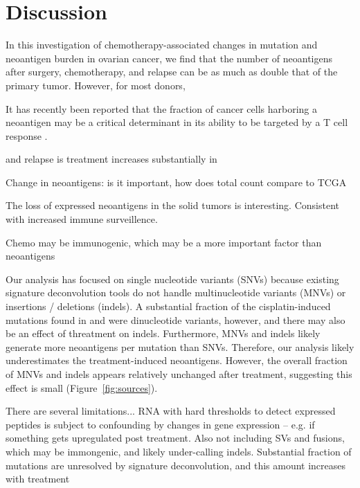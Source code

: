 \section*{Discussion}

In this investigation of chemotherapy-associated changes in mutation and neoantigen burden in ovarian cancer, we find that the number of neoantigens after surgery, chemotherapy, and relapse can be as much as double that of the primary tumor. However, for most donors, 


It has recently been reported that the fraction of cancer cells harboring a neoantigen may be a critical determinant in its ability to be targeted by a T cell response \cite{McGranahan_2016}. 

and relapse is  treatment increases substantially in  

Change in neoantigens: is it important, how does total count compare to TCGA


The loss of expressed neoantigens in the solid tumors is interesting. Consistent with increased immune surveillence.

Chemo may be immunogenic, which may be a more important factor than neoantigens

Our analysis has focused on single nucleotide variants (SNVs) because existing signature deconvolution tools do not handle multinucleotide variants (MNVs) or insertions / deletions (indels). A substantial fraction of the cisplatin-induced mutations found in \cite{Meier_2014} and \cite{Szikriszt_2016} were dinucleotide variants, however, and there may also be an effect of threatment on indels. Furthermore, MNVs and indels likely generate more neoantigens per mutation than SNVs. Therefore, our analysis likely underestimates the treatment-induced neoantigens. However, the overall fraction of MNVs and indels appears relatively unchanged after treatment, suggesting this effect is small (Figure~\ref{fig:sources}).

There are several limitations... RNA with hard thresholds to detect expressed peptides is subject to confounding by changes in gene expression -- e.g. if something gets upregulated post treatment. Also not including SVs and fusions, which may be immongenic, and likely under-calling indels. Substantial fraction of mutations are unresolved by signature deconvolution, and this amount increases with treatment